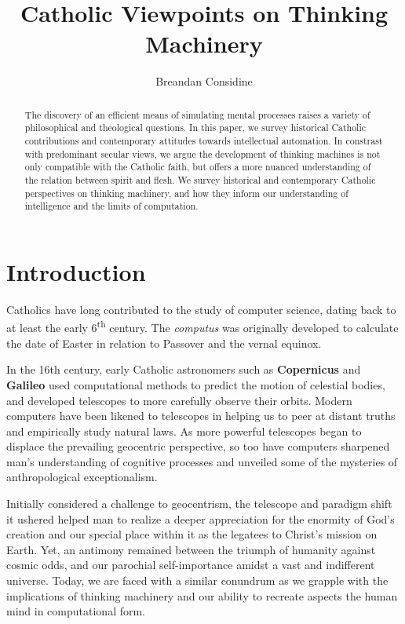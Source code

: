 \documentclass[sigplan,nonacm]{acmart}\settopmatter{printfolios=false,printccs=false,printacmref=false}
\begin{document}
  \title{Catholic Viewpoints on Thinking Machinery}
  \begin{abstract}
  The discovery of an efficient means of simulating mental processes raises a variety of philosophical and theological questions. In this paper, we survey historical Catholic contributions and contemporary attitudes towards intellectual automation. In constrast with predominant secular views, we argue the development of thinking machines is not only compatible with the Catholic faith, but offers a more nuanced understanding of the relation between spirit and flesh. We survey historical and contemporary Catholic perspectives on thinking machinery, and how they inform our understanding of intelligence and the limits of computation.
  \end{abstract}

  \author{Breandan Considine}

  \maketitle

  \section{Introduction}

  Catholics have long contributed to the study of computer science, dating back to at least the early 6\textsuperscript{th} century. The \textit{computus} was originally developed to calculate the date of Easter in relation to Passover and the vernal equinox.

  In the 16th century, early Catholic astronomers such as \textbf{Copernicus} and \textbf{Galileo} used computational methods to predict the motion of celestial bodies, and developed telescopes to more carefully observe their orbits. Modern computers have been likened to telescopes in helping us to peer at distant truths and empirically study natural laws. As more powerful telescopes began to displace the prevailing geocentric perspective, so too have computers sharpened man's understanding of cognitive processes and unveiled some of the mysteries of anthropological exceptionalism.

  Initially considered a challenge to geocentrism, the telescope and paradigm shift it ushered helped man to realize a deeper appreciation for the enormity of God's creation and our special place within it as the legatees to Christ's mission on Earth. Yet, an antimony remained between the triumph of humanity against cosmic odds, and our parochial self-importance amidst a vast and indifferent universe. Today, we are faced with a similar conundrum as we grapple with the implications of thinking machinery and our ability to recreate aspects the human mind in computational form.
\end{document}
